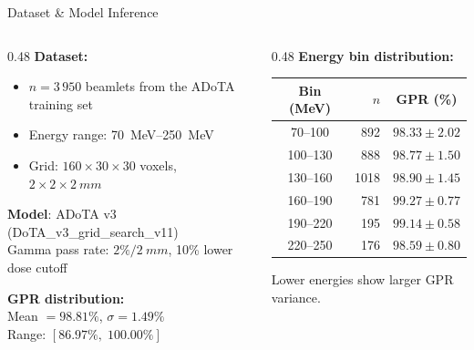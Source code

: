 \documentclass[aspectratio=169, 10pt]{beamer}
\begin{document}
\begin{frame}{Dataset \& Model Inference}
  \begin{columns}[T]
    \begin{column}{0.48\textwidth}
      \textbf{Dataset:}
      \begin{itemize}
        \item $n = 3\,950$ beamlets from the ADoTA training set
        \item Energy range: \SIrange{70}{250}{MeV}
        \item Grid: $160 \times 30 \times 30$ voxels,
              $2 \times 2 \times \SI{2}{mm}$
      \end{itemize}

      \vspace{6pt}
      \textbf{Model}: ADoTA v3 (DoTA\_v3\_grid\_search\_v11)\\
      Gamma pass rate: $2\%/\SI{2}{mm}$, 10\% lower dose cutoff

      \vspace{6pt}
      \textbf{GPR distribution:}\\
      Mean $= 98.81\%$, $\sigma = 1.49\%$\\
      Range: $[86.97\%,\; 100.00\%]$
    \end{column}
    \begin{column}{0.48\textwidth}
      \textbf{Energy bin distribution:}
      \vspace{4pt}
      \begin{center}
        \begin{tabular}{crc}
          \toprule
          \textbf{Bin (MeV)} & \textbf{$n$} & \textbf{GPR (\%)} \\
          \midrule
          70--100  & 892  & $98.33 \pm 2.02$ \\
          100--130 & 888  & $98.77 \pm 1.50$ \\
          130--160 & 1018 & $98.90 \pm 1.45$ \\
          160--190 & 781  & $99.27 \pm 0.77$ \\
          190--220 & 195  & $99.14 \pm 0.58$ \\
          220--250 & 176  & $98.59 \pm 0.80$ \\
          \bottomrule
        \end{tabular}
      \end{center}
      {\small Lower energies show larger GPR variance.}
    \end{column}
  \end{columns}
\end{frame}
\end{document}
